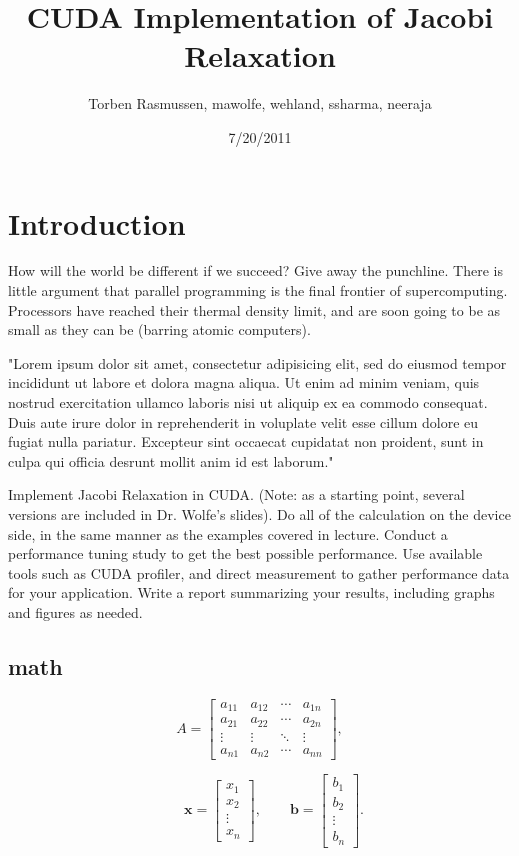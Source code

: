 \documentclass[11pt, twocolumn]{article}
\title{CUDA Implementation of Jacobi Relaxation}
\author{Torben Rasmussen, mawolfe, wehland, ssharma, neeraja}
\date{7/20/2011}
\begin{document}
\maketitle

\section{Introduction} %
How will the world be different if we succeed?
Give away the punchline\cite{keyname1}.
There is little argument that parallel programming is the final frontier of supercomputing.
Processors have reached their thermal density limit, and are soon going to be as small as they can be (barring atomic computers).

"Lorem ipsum dolor sit amet, consectetur adipisicing elit, sed do eiusmod tempor incididunt ut labore et dolora magna aliqua.  Ut enim ad minim veniam, quis nostrud exercitation ullamco laboris nisi ut aliquip ex ea commodo consequat.  Duis aute irure dolor in reprehenderit in voluplate velit esse cillum dolore eu fugiat nulla pariatur.  Excepteur sint occaecat cupidatat non proident, sunt in culpa qui officia desrunt mollit anim id est laborum."

Implement Jacobi Relaxation in CUDA.  
(Note: as a starting point, several versions are included in Dr. Wolfe's slides).
Do all of the calculation on the device side, in the same manner as the examples covered in lecture.
Conduct a performance tuning study to get the best possible performance.
Use available tools such as CUDA profiler, and direct measurement to gather performance data for your application.
Write a report summarizing your results, including graphs and figures as needed.

\subsection{math} 
\begin{equation}
A=\begin{bmatrix} a_{11} & a_{12} & \cdots & a_{1n} \\ a_{21} & a_{22} & \cdots & a_{2n} \\ \vdots & \vdots & \ddots & \vdots \\a_{n1} & a_{n2} & \cdots & a_{nn} \end{bmatrix}, 
\end{equation}

\begin{equation}
\qquad  \mathbf{x} = \begin{bmatrix} x_{1} \\ x_2 \\ \vdots \\ x_n \end{bmatrix},
\qquad  \mathbf{b} = \begin{bmatrix} b_{1} \\ b_2 \\ \vdots \\ b_n \end{bmatrix}.
\end{equation}
\end{document}
